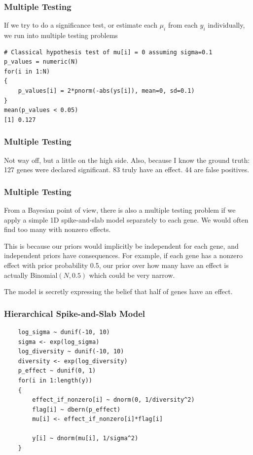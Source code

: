 \documentclass{beamer}
\begin{document}
\begin{frame}[fragile]
\frametitle{Multiple Testing}
If we try to do a significance test, or estimate each $\mu_i$ from each
$y_i$ individually, we run into multiple testing problems

\begin{verbatim}
# Classical hypothesis test of mu[i] = 0 assuming sigma=0.1
p_values = numeric(N)
for(i in 1:N)
{
    p_values[i] = 2*pnorm(-abs(ys[i]), mean=0, sd=0.1)
}
mean(p_values < 0.05)
[1] 0.127
\end{verbatim}

\end{frame}

\begin{frame}
\frametitle{Multiple Testing}

Not way off, but a little on the high side. Also, because I know the ground
truth: 127 genes were declared significant. 83 truly have an effect.
44 are false positives.


\end{frame}

\begin{frame}
\frametitle{Multiple Testing}
From a Bayesian point of view, there is also a multiple testing problem
if we apply a simple 1D spike-and-slab model separately to each
gene. We would often find too many with nonzero effects.\pause

This is because our priors would implicitly be independent for each gene,
and independent priors have consequences. For example, if each gene has a
nonzero effect with prior probability 0.5, our prior over how many have an
effect is actually Binomial$(N, 0.5)$ which could be very narrow.

The model is secretly expressing the belief that half of genes have an effect.
\end{frame}


\begin{frame}[fragile]
\frametitle{Hierarchical Spike-and-Slab Model}

{\footnotesize
\begin{verbatim}
    log_sigma ~ dunif(-10, 10)
    sigma <- exp(log_sigma)
    log_diversity ~ dunif(-10, 10)
    diversity <- exp(log_diversity)
    p_effect ~ dunif(0, 1)
    for(i in 1:length(y))
    {
        effect_if_nonzero[i] ~ dnorm(0, 1/diversity^2)
        flag[i] ~ dbern(p_effect)
        mu[i] <- effect_if_nonzero[i]*flag[i]

        y[i] ~ dnorm(mu[i], 1/sigma^2)
    }
\end{verbatim}
}

\end{frame}
\end{document}
